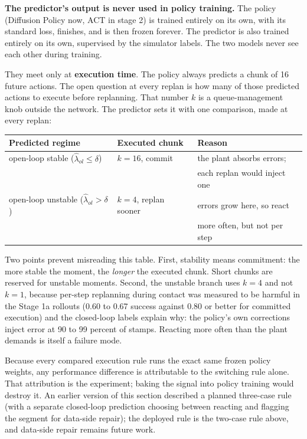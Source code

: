 \documentclass[11pt]{article}
\begin{document}
\textbf{The predictor's output is never used in policy training.} The policy
(Diffusion Policy now, ACT in stage 2) is trained entirely on its own, with its
standard loss, finishes, and is then frozen forever. The predictor is also trained
entirely on its own, supervised by the simulator labels. The two models never see
each other during training.

They meet only at \textbf{execution time}. The policy always predicts a chunk of 16
future actions. The open question at every replan is how many of those predicted
actions to execute before replanning. That number $k$ is a queue-management knob
outside the network. The predictor sets it with one comparison, made at every
replan:

\begin{center}
\begin{tabular}{@{}lll@{}}
\toprule
Predicted regime & Executed chunk & Reason \\
\midrule
open-loop stable ($\hat\lambda_{ol} \leq \delta$) & $k = 16$, commit &
  the plant absorbs errors; \\
 & & each replan would inject one \\
open-loop unstable ($\hat\lambda_{ol} > \delta$) & $k = 4$, replan sooner &
  errors grow here, so react \\
 & & more often, but not per step \\
\bottomrule
\end{tabular}
\end{center}

Two points prevent misreading this table. First, stability means commitment:
the more stable the moment, the \emph{longer} the executed chunk. Short chunks
are reserved for unstable moments. Second, the unstable branch uses $k = 4$
and not $k = 1$, because per-step replanning during contact was measured to be
harmful in the Stage 1a rollouts (0.60 to 0.67 success against 0.80 or better
for committed execution) and the closed-loop labels explain why: the policy's
own corrections inject error at 90 to 99 percent of stamps. Reacting more
often than the plant demands is itself a failure mode.

Because every compared execution rule runs the exact same frozen policy
weights, any performance difference is attributable to the switching rule
alone. That attribution is the experiment; baking the signal into policy
training would destroy it. An earlier version of this section described a
planned three-case rule (with a separate closed-loop prediction choosing
between reacting and flagging the segment for data-side repair); the deployed
rule is the two-case rule above, and data-side repair remains future work.
\end{document}

